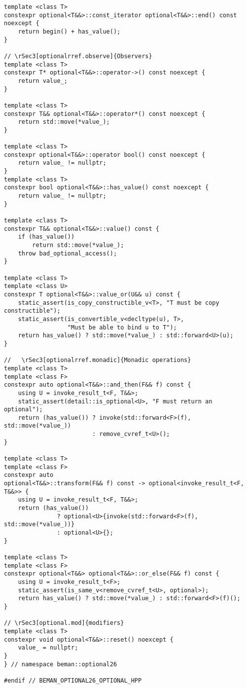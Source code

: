 \documentclass[a4paper,10pt,oneside,openany,final,article]{memoir}
\begin{document}
\begin{verbatim}
template <class T>
constexpr optional<T&&>::const_iterator optional<T&&>::end() const noexcept {
    return begin() + has_value();
}

// \rSec3[optionalrref.observe]{Observers}
template <class T>
constexpr T* optional<T&&>::operator->() const noexcept {
    return value_;
}

template <class T>
constexpr T&& optional<T&&>::operator*() const noexcept {
    return std::move(*value_);
}

template <class T>
constexpr optional<T&&>::operator bool() const noexcept {
    return value_ != nullptr;
}
template <class T>
constexpr bool optional<T&&>::has_value() const noexcept {
    return value_ != nullptr;
}

template <class T>
constexpr T&& optional<T&&>::value() const {
    if (has_value())
        return std::move(*value_);
    throw bad_optional_access();
}

template <class T>
template <class U>
constexpr T optional<T&&>::value_or(U&& u) const {
    static_assert(is_copy_constructible_v<T>, "T must be copy constructible");
    static_assert(is_convertible_v<decltype(u), T>,
                  "Must be able to bind u to T");
    return has_value() ? std::move(*value_) : std::forward<U>(u);
}

//   \rSec3[optionalrref.monadic]{Monadic operations}
template <class T>
template <class F>
constexpr auto optional<T&&>::and_then(F&& f) const {
    using U = invoke_result_t<F, T&&>;
    static_assert(detail::is_optional<U>, "F must return an optional");
    return (has_value()) ? invoke(std::forward<F>(f), std::move(*value_))
                         : remove_cvref_t<U>();
}

template <class T>
template <class F>
constexpr auto
optional<T&&>::transform(F&& f) const -> optional<invoke_result_t<F, T&&>> {
    using U = invoke_result_t<F, T&&>;
    return (has_value())
               ? optional<U>{invoke(std::forward<F>(f), std::move(*value_))}
               : optional<U>{};
}

template <class T>
template <class F>
constexpr optional<T&&> optional<T&&>::or_else(F&& f) const {
    using U = invoke_result_t<F>;
    static_assert(is_same_v<remove_cvref_t<U>, optional>);
    return has_value() ? std::move(*value_) : std::forward<F>(f)();
}

// \rSec3[optional.mod]{modifiers}
template <class T>
constexpr void optional<T&&>::reset() noexcept {
    value_ = nullptr;
}
} // namespace beman::optional26

#endif // BEMAN_OPTIONAL26_OPTIONAL_HPP

\end{verbatim}
\end{document}
